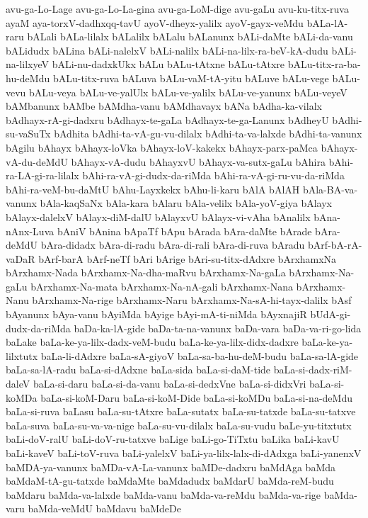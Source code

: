 {avu-ga-Lo-Lage
avu-ga-Lo-La-gina
avu-ga-LoM-dige
avu-gaLu
avu-ku-titx-ruva
ayaM
aya-torxV-dadhxqq-tavU
ayoV-dheyx-yalilx
ayoV-gayx-veMdu
bALa-lA-raru
bALali
bALa-lilalx
bALalilx
bALalu
bALanunx
bALi-daMte
bALi-da-vanu
bALidudx
bALina
bALi-nalelxV
bALi-nalilx
bALi-na-lilx-ra-beV-kA-dudu
bALi-na-lilxyeV
bALi-nu-dadxkUkx
bALu
bALu-tAtxne
bALu-tAtxre
bALu-titx-ra-ba-hu-deMdu
bALu-titx-ruva
bALuva
bALu-vaM-tA-yitu
bALuve
bALu-vege
bALu-vevu
bALu-veya
bALu-ve-yalUlx
bALu-ve-yalilx
bALu-ve-yanunx
bALu-veyeV
bAMbanunx
bAMbe
bAMdha-vanu
bAMdhavayx
bANa
bAdha-ka-vilalx
bAdhayx-rA-gi-dadxru
bAdhayx-te-gaLa
bAdhayx-te-ga-Lanunx
bAdheyU
bAdhi-su-vaSuTx
bAdhita
bAdhi-ta-vA-gu-vu-dilalx
bAdhi-ta-va-lalxde
bAdhi-ta-vanunx
bAgilu
bAhayx
bAhayx-loVka
bAhayx-loV-kakekx
bAhayx-parx-paMca
bAhayx-vA-du-deMdU
bAhayx-vA-dudu
bAhayxvU
bAhayx-va-sutx-gaLu
bAhira
bAhi-ra-LA-gi-ra-lilalx
bAhi-ra-vA-gi-dudx-da-riMda
bAhi-ra-vA-gi-ru-vu-da-riMda
bAhi-ra-veM-bu-daMtU
bAhu-Layxkekx
bAhu-li-karu
bAlA
bAlAH
bAla-BA-va-vanunx
bAla-kaqSaNx
bAla-kara
bAlaru
bAla-velilx
bAla-yoV-giya
bAlayx
bAlayx-dalelxV
bAlayx-diM-dalU
bAlayxvU
bAlayx-vi-vAha
bAnalilx
bAna-nAnx-Luva
bAniV
bAnina
bApaTf
bApu
bArada
bAra-daMte
bArade
bAra-deMdU
bAra-didadx
bAra-di-radu
bAra-di-rali
bAra-di-ruva
bAradu
bArf-bA-rA-vaDaR
bArf-barA
bArf-neTf
bAri
bArige
bAri-su-titx-dAdxre
bArxhamxNa
bArxhamx-Nada
bArxhamx-Na-dha-maRvu
bArxhamx-Na-gaLa
bArxhamx-Na-gaLu
bArxhamx-Na-mata
bArxhamx-Na-nA-gali
bArxhamx-Nana
bArxhamx-Nanu
bArxhamx-Na-rige
bArxhamx-Naru
bArxhamx-Na-sA-hi-tayx-dalilx
bAsf
bAyanunx
bAya-vanu
bAyiMda
bAyige
bAyi-mA-ti-niMda
bAyxnajiR
bUdA-gi-dudx-da-riMda
baDa-ka-lA-gide
baDa-ta-na-vanunx
baDa-vara
baDa-va-ri-go-lida
baLake
baLa-ke-ya-lilx-dadx-veM-budu
baLa-ke-ya-lilx-didx-dadxre
baLa-ke-ya-lilxtutx
baLa-li-dAdxre
baLa-sA-giyoV
baLa-sa-ba-hu-deM-budu
baLa-sa-lA-gide
baLa-sa-lA-radu
baLa-si-dAdxne
baLa-sida
baLa-si-daM-tide
baLa-si-dadx-riM-daleV
baLa-si-daru
baLa-si-da-vanu
baLa-si-dedxVne
baLa-si-didxVri
baLa-si-koMDa
baLa-si-koM-Daru
baLa-si-koM-Dide
baLa-si-koMDu
baLa-si-na-deMdu
baLa-si-ruva
baLasu
baLa-su-tAtxre
baLa-sutatx
baLa-su-tatxde
baLa-su-tatxve
baLa-suva
baLa-su-va-va-nige
baLa-su-vu-dilalx
baLa-su-vudu
baLe-yu-titxtutx
baLi-doV-ralU
baLi-doV-ru-tatxve
baLige
baLi-go-TiTxtu
baLika
baLi-kavU
baLi-kaveV
baLi-toV-ruva
baLi-yalelxV
baLi-ya-lilx-lalx-di-dAdxga
baLi-yanenxV
baMDA-ya-vanunx
baMDa-vA-La-vanunx
baMDe-dadxru
baMdAga
baMda
baMdaM-tA-gu-tatxde
baMdaMte
baMdadudx
baMdarU
baMda-reM-budu
baMdaru
baMda-va-lalxde
baMda-vanu
baMda-va-reMdu
baMda-va-rige
baMda-varu
baMda-veMdU
baMdavu
baMdeDe
}
